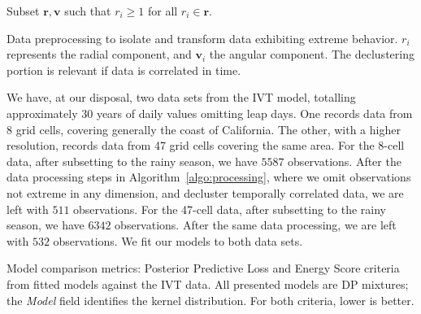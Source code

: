 \begin{algorithm}
  Subset $\bm{ r},\bm{ v}$ such that $r_i \geq 1$ for all $r_i\in \bm{r}$.\\
 \caption{Data preprocessing to isolate and transform data exhibiting extreme behavior.  $r_i$
   represents the radial component, and $\bm{v}_i$ the angular component.  The declustering 
   portion is relevant if data is correlated in time.\label{algo:processing}}
\end{algorithm}

We have, at our disposal, two data sets from the IVT model, totalling approximately 30 years of daily
  values omitting leap days.  One records data from 8 grid cells, covering
  generally the coast of California.  The other, with a higher resolution, records data from 47 grid
  cells covering the same area.  For the 8-cell data, after subsetting to the rainy season, we have 
  $5587$ observations.  After the data processing steps in Algorithm~\ref{algo:processing}, where we omit observations not extreme in any dimension, and decluster temporally correlated data, we are left with $511$ observations.  For the 47-cell data, after subsetting to the rainy season, we have $6342$ observations.  After the same data processing, we are left with 
  $532$ observations.  We fit our models to both data sets.

\begin{table}[b]
  \centering
  \caption{Model comparison metrics: Posterior Predictive Loss and Energy Score criteria from fitted
    models against the IVT data.  All presented models are DP mixtures; the \emph{Model} field
    identifies the kernel distribution.  For both criteria, lower is better.
  \label{tab:dev}}
  
\end{table}

